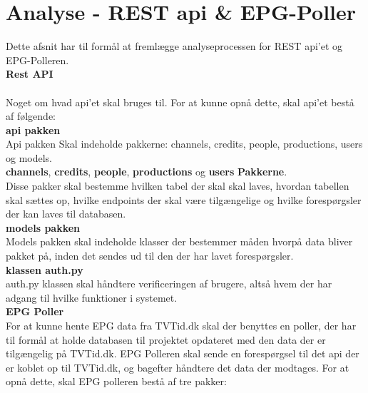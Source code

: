 \section{Analyse - REST api \& EPG-Poller} \label{api_epg_analysis}
Dette afsnit har til formål at fremlægge analyseprocessen for REST api'et og EPG-Polleren. \\

{\large\textbf{Rest API}}\\
 \\
Noget om hvad api'et skal bruges til. For at kunne opnå dette, skal api'et bestå af følgende:\\

\textbf{api pakken} \\
Api pakken Skal indeholde pakkerne: channels, credits, people, productions, users og models. \\

\textbf{channels}, \textbf{credits}, \textbf{people}, \textbf{productions} og \textbf{users} \textbf{Pakkerne}.\\
Disse pakker skal bestemme hvilken tabel der skal skal laves, hvordan tabellen skal sættes op, hvilke endpoints der skal være tilgængelige og hvilke forespørgsler der kan laves til databasen.\\

\textbf{models pakken} \\
Models pakken skal indeholde klasser der bestemmer måden hvorpå data bliver pakket på, inden det sendes ud til den der har lavet forespørgsler. \\

\textbf{klassen auth.py} \\
auth.py klassen skal håndtere verificeringen af brugere, altså hvem der har adgang til hvilke funktioner i systemet.\\


{\large\textbf{EPG Poller}}\\
For at kunne hente EPG data fra TVTid.dk skal der benyttes en poller, der har til formål at holde databasen til projektet opdateret med den data der er tilgængelig på TVTid.dk. EPG Polleren skal sende en forespørgsel til det api der er koblet op til TVTid.dk, og bagefter håndtere det data der modtages. For at opnå dette, skal EPG polleren bestå af tre pakker:\\

